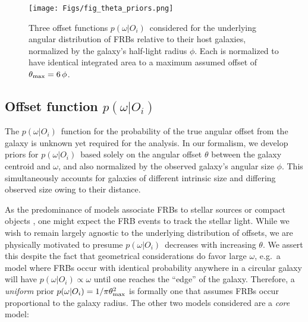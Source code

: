 \documentclass[twocolumn,linenumbers]{aastex63}
\newcommand{\mhalflight}{\phi} %
\newcommand{\halflight}{$\mhalflight$}
\newcommand{\mthmax}{\theta_{\rm max}}  %
\newcommand{\mpoffset}{p(\omega|O_i)}  %
\newcommand{\poffset}{$\mpoffset$}
\begin{document}
\begin{figure}[!ht]
\centering
    \texttt{[image: Figs/fig\_theta\_priors.png]}
    \caption{
    Three offset functions \poffset\ considered for the underlying angular distribution of FRBs relative 
    to their host galaxies, normalized by the galaxy's half-light radius \halflight.
    Each is normalized to have identical integrated area to a maximum assumed offset of $\mthmax = 6 \, \mhalflight$. 
    }
	\label{fig:theta_prior}
\end{figure}

\subsection{Offset function \poffset}
\label{sec:poffset}

The \poffset\ function
for the probability of the true angular offset from the 
galaxy is unknown yet required for the analysis. 
In our formalism, we develop priors for \poffset\ based
solely on the angular offset $\theta$ between the galaxy
centroid and $\omega$, and also
normalized by the observed galaxy's angular size
\halflight.  This simultaneously accounts
for galaxies of different intrinsic size and differing
observed size owing to their distance.

As the predominance of models associate FRBs
to stellar sources or compact objects
\citep[AGN at the very centers of galaxies are currently disfavored;][]{Bhandari20a}, one might expect
the FRB events to track the stellar light. 
While we wish to remain largely agnostic to the
underlying distribution of offsets, we are
physically motivated to presume \poffset\ 
decreases with increasing $\theta$.
We assert this despite the fact that geometrical
considerations do favor large $\omega$, e.g.\ 
a model where FRBs occur with identical probability
anywhere in a circular galaxy will have
$\mpoffset \propto \omega$ until one reaches the
``edge'' of the galaxy.
Therefore, a {\it uniform} prior 
$\mpoffset =  1 / \pi \theta_{\rm max}^{2}$
is formally one that assumes FRBs occur 
proportional to the galaxy radius.
The other two models considered are a {\it core} model: 
\end{document}
